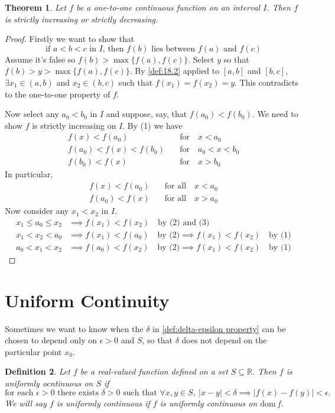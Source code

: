 \documentclass[12pt, lettersize]{book}
\newtheorem{thm}{Theorem}[section]
\newtheorem{dfn}[thm]{Definition}
\newcommand{\R}{\mathbb{R}}
\newcommand{\dom}{\text{dom}\,}
\begin{document}
			\setcounter{equation}{0}
			\begin{thm}
			Let $f$ be a \emph{one-to-one} continuous function on an interval $I$. Then $f$ is strictly increasing or strictly decreasing.
			\end{thm}
			\begin{proof}
			Firstly we want to show that
			\begin{equation}
				\text{if $a<b<c$ in $I$, then $f(b)$ lies between $f(a)$ and $f(c)$}
			\end{equation}
			Assume it's false so $f(b)>\max\{f(a),f(c)\}$. Select $y$ so that $f(b)>y>\max\{f(a),f(c)\}$. By \ref{def:18.2} applied to $[a,b]$ and $[b,c]$, $\exists x_1\in(a,b)$ and $x_2\in(b,c)$ such that $f(x_1)=f(x_2)=y$. This contradicts to the one-to-one property of $f$. 
			
			Now select any $a_0<b_0$ in $I$ and suppose, say, that $f(a_0)<f(b_0)$. We need to show $f$ is strictly increasing on $I$. By (1) we have
			\begin{align*}
				f(x)<f(a_0)\quad&\text{for}\quad x<a_0\\
				f(a_0)<f(x)<f(b_0)\quad&\text{for}\quad a_0<x<b_0\\
				f(b_0)<f(x)\quad&\text{for}\quad x>b_0
			\end{align*}
			In particular,
			\begin{align}
				f(x)<f(a_0)\quad&\text{for all}\quad x<a_0\\
				f(a_0)<f(x)\quad&\text{for all}\quad x>a_0
			\end{align}
			Now consider any $x_1<x_2$ in $I$.
			\begin{align*}
				x_1\leq a_0\leq x_2 &\implies f(x_1)<f(x_2)\quad\text{by (2) and (3)}\\
				x_1<x_2<a_0&\implies f(x_1)<f(a_0)\quad\text{by (2)} \implies f(x_1)<f(x_2)\quad\text{by (1)}\\
				a_0<x_1<x_2&\implies f(a_0)<f(x_2)\quad\text{by (2)} \implies f(x_1)<f(x_2)\quad\text{by (1)}
			\end{align*}
			\end{proof}
			\newpage
		\section{Uniform Continuity}
			Sometimes we want to know when the $\delta$ in \ref{def:delta-epsilon property} can be chosen to depend only on
			$\epsilon>0$ and $S$, so that $\delta$ does not depend on the particular point $x_0$.
			\begin{dfn}
			Let $f$ be a real-valued function defined on a set $S\subseteq\R$. Then $f$ is uniformly ocntinuous on $S$ if
			\begin{displaymath}
				\text{for each $\epsilon>0$ there exists $\delta>0$ such that $\forall x,y\in S,\ |x-y|<\delta\implies|f(x)-f(y)|<\epsilon.$}
			\end{displaymath}
			We will say $f$ is uniformly continuous if $f$ is uniformly continuous on $\dom f$.
			\end{dfn}
			
\end{document}
